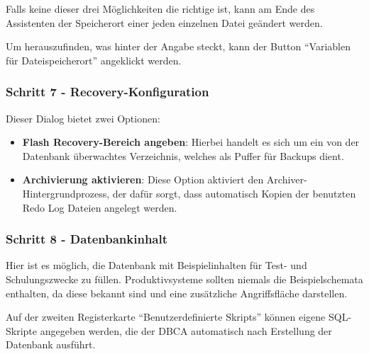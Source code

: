           Falls keine dieser drei Möglichkeiten die richtige ist, kann am Ende des Assistenten der Speicherort einer jeden einzelnen Datei geändert werden.

          Um herauszufinden, was hinter der Angabe  steckt, kann der Button \enquote{Variablen für Dateispeicherort} angeklickt werden.
        \subsubsection{Schritt 7 - Recovery-Konfiguration}
          Dieser Dialog bietet zwei Optionen:
          \begin{itemize}
            \item \textbf{Flash Recovery-Bereich angeben}: Hierbei handelt es sich um ein von der Datenbank überwachtes Verzeichnis, welches als Puffer für Backups dient.
            \item \textbf{Archivierung aktivieren}: Diese Option aktiviert den Archiver-Hintergrundprozess, der dafür sorgt, dass automatisch Kopien der benutzten Redo Log Dateien angelegt werden.
          \end{itemize}
        \subsubsection{Schritt 8 - Datenbankinhalt}
          Hier ist es möglich, die Datenbank mit Beispielinhalten für Test-
          und Schulungszwecke zu füllen. Produktivsysteme sollten niemals die
          Beispielschemata enthalten, da diese bekannt sind und eine
          zusätzliche Angriffsfläche darstellen.

          Auf der zweiten Registerkarte \enquote{Benutzerdefinierte Skripts}
          können eigene SQL-Skripte angegeben werden, die der DBCA automatisch
          nach Erstellung der Datenbank ausführt.
